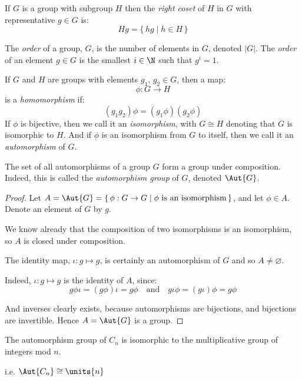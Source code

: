 \begin{definition}
    If \(G\) is a group with subgroup \(H\) then the \emph{right coset} of \(H\) in \(G\) with representative \(g \in
    G\) is:
    \[Hg = \{\,hg \mid h \in H\,\}\]
\end{definition}

\begin{definition}
    The \emph{order} of a group, \(G\), is the number of elements in \(G\), denoted \(|G|\).
    The \emph{order} of an element \(g \in G\) is the smallest \(i \in \N\) such that \(g^i = 1\).
\end{definition}

\begin{definition}
    If \(G\) and \(H\) are groups with elements \(g_1,\, g_2 \in G\), then a map:
    \[\phi:G \to H\]
    is a \emph{homomorphism} if:
    \[(g_1 g_2)\phi = (g_1\phi)(g_2\phi)\]
    If \(\phi\) is bijective, then we call it an \emph{isomorphism}, with \(G \cong H\) denoting that \(G\) is
    isomorphic to \(H\).
    And if \(\phi\) is an isomorphism from \(G\) to itself, then we call it an \emph{automorphism} of \(G\).
\end{definition}

\begin{lemma}
    The set of all automorphisms of a group \(G\) form a group under composition.
    Indeed, this is called the \emph{automorphism group} of \(G\), denoted \(\Aut{G}\).
\end{lemma}

\begin{proof}
    Let \(A = \Aut{G} = \{\,\phi:G \to G \mid \phi\ \text{is an isomorphism}\,\}\), and let \(\phi \in A\).
    Denote an element of \(G\) by \(g\).

    We know already that the composition of two isomorphisms is an isomorphism, so \(A\) is closed under composition.

    The identity map, \(\iota:g \mapsto g\), is certainly an automorphism of \(G\) and so \(A \neq \varnothing\).

    Indeed, \(\iota:g \mapsto g\) is the identity of \(A\), since:
    \[g\phi\iota = (g\phi)\iota = g\phi \quad \text{and} \quad g\iota\phi = (g\iota)\phi = g\phi\]

    And inverses clearly exists, because automorphisms are bijections, and bijections are invertible.
    Hence \(A = \Aut{G}\) is a group.
\end{proof}

\begin{lemma}\label{lem:aut}
    The automorphism group of \(C_n\) is isomorphic to the multiplicative group
    of integers mod \(n\).

    i.e. \(\Aut{C_n} \cong \units{n}\)
\end{lemma}

